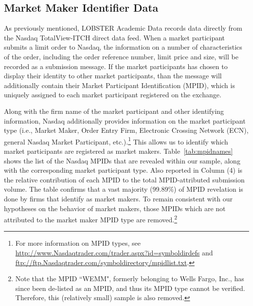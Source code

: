 \documentclass{article}
\begin{document}
\subsection{Market Maker Identifier Data}\label{subsec:MMID}

As previously mentioned, LOBSTER Academic Data records data directly from the Nasdaq TotalView-ITCH direct data feed. When a market participant submits a limit order to Nasdaq, the information on a number of characteristics of the order, including the order reference number, limit price and size, will be recorded as a submission message. If the market participants has chosen to display their identity to other market participants, than the message will additionally contain their Market Participant Identification (MPID), which is uniquely assigned to each market participant registered on the exchange.

\noindent Along with the firm name of the market participant and other identifying information, Nasdaq additionally provides information on the market participant type (i.e., Market Maker, Order Entry Firm, Electronic Crossing Network (ECN), general Nasdaq Market Participant, etc.).\footnote{For more information on MPID types, see \url{http://www.Nasdaqtrader.com/trader.aspx?id=symboldirdefs} and \url{ftp://ftp.Nasdaqtrader.com/symboldirectory/mpidlist.txt}.} This allows us to identify which market participants are registered as market makers. Table~\ref{tab:mpidnames} shows the list of the Nasdaq MPIDs that are revealed within our sample, along with the corresponding market participant type. Also reported in Column (4) is the relative contribution of each MPID to the total MPID-attributed submission volume. The table confirms that a vast majority (99.89\%) of MPID revelation is done by firms that identify as market makers. To remain consistent with our hypotheses on the behavior of market makers, those MPIDs which are not attributed to the market maker MPID type are removed.\footnote{Note that the MPID ``WEMM", formerly belonging to Wells Fargo, Inc., has since been de-listed as an MPID, and thus its MPID type cannot be verified. Therefore, this (relatively small) sample is also removed.}
\end{document}
